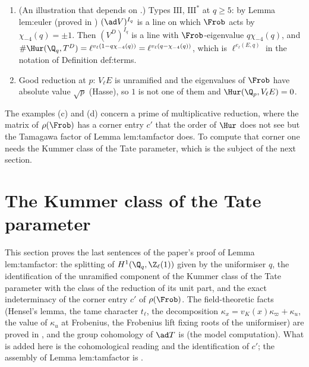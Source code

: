 \begin{example}
\begin{enumerate}[label=(\alph*)]
$V^D=V(1)$ the eigenvalue of $\Frob$ on $(V^D)^I$ is $p^2$ and that of $\Phi$ is $p^{-2}$. So $\det(1-\Phi\mid(V^D)^I)=1-p^{-2}$, the paper's $L_p(A_f,1)^{-1}$ at a
multiplicative prime, while $\det(1-\Frob\mid(V^D)^I)=1-p^2$: different numbers, with the same $\ell$-adic valuation $v_\ell(p^2-1)$ and the same nonvanishing.
By (iv), $\#\Hur(\Q_p,T^D)=\ell^{v_\ell(p^2-1)}$.
\item (An illustration that depends on .) Types $\mathrm{III}$, $\mathrm{III}^*$ at $q\ge5$: by Lemma lem:euler (proved in ) $(\ad V)^{I_q}$ is a line on which $\Frob$ acts by
$\chi_{-4}(q)=\pm1$. Then $(V^D)^{I_q}$ is a line with $\Frob$-eigenvalue $q\chi_{-4}(q)$, and $\#\Hur(\Q_q,T^D)=\ell^{v_\ell(1-q\chi_{-4}(q))}=\ell^{v_\ell(q-\chi_{-4}(q))}$, which is
$\ell^{e_\ell(E,q)}$ in the notation of Definition def:terms.
\item Good reduction at $p$: $V_\ell E$ is unramified and the eigenvalues of $\Frob$ have absolute value $\sqrt p$ (Hasse), so $1$ is not one of them and
$\Hur(\Q_p,V_\ell E)=0$.
\end{enumerate}
\end{example}

The examples (c) and (d) concern a prime of multiplicative reduction, where the matrix of $\rho(\Frob)$ has a corner entry $c'$ that the order of $\Hur$ does not see but
the Tamagawa factor of Lemma lem:tamfactor does. To compute that corner one needs the Kummer class of the Tate parameter, which is the subject of the next section.
\section{The Kummer class of the Tate parameter}\label{sec:galcoh:tate}

This section proves the last sentences of the paper's proof of Lemma lem:tamfactor: the splitting of $H^1(\Q_q,\Z_\ell(1))$ given by the uniformiser $q$, the
identification of the unramified component of the Kummer class of the Tate parameter with the class of the reduction of its unit part, and the exact
indeterminacy of the corner entry $c'$ of $\rho(\Frob)$. The field-theoretic facts (Hensel's lemma, the tame character $t_\ell$, the decomposition
$\kappa_x=v_K(x)\kappa_\varpi+\kappa_u$, the value of $\kappa_u$ at Frobenius, the Frobenius lift fixing roots of the uniformiser) are proved in , and
the group cohomology of $\ad T$ is  (the model computation). What is added here is the cohomological reading and the identification of $c'$; the assembly of Lemma lem:tamfactor is .

